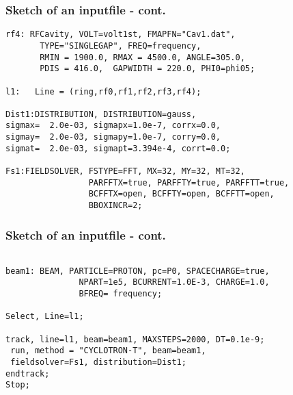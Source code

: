 \documentclass[xcolor=pdftex,table,10pt,yellow,mathserif]{beamer}
\begin{document}
\begin{frame}[fragile]
\frametitle{Sketch of an inputfile - cont.} 
\begin{verbatim}
rf4: RFCavity, VOLT=volt1st, FMAPFN="Cav1.dat", 
       TYPE="SINGLEGAP", FREQ=frequency, 
       RMIN = 1900.0, RMAX = 4500.0, ANGLE=305.0, 
       PDIS = 416.0,  GAPWIDTH = 220.0, PHI0=phi05; 

l1:   Line = (ring,rf0,rf1,rf2,rf3,rf4);

Dist1:DISTRIBUTION, DISTRIBUTION=gauss,
sigmax=  2.0e-03, sigmapx=1.0e-7, corrx=0.0,
sigmay=  2.0e-03, sigmapy=1.0e-7, corry=0.0,
sigmat=  2.0e-03, sigmapt=3.394e-4, corrt=0.0;

Fs1:FIELDSOLVER, FSTYPE=FFT, MX=32, MY=32, MT=32, 
                 PARFFTX=true, PARFFTY=true, PARFFTT=true,
                 BCFFTX=open, BCFFTY=open, BCFFTT=open, 
                 BBOXINCR=2;
\end{verbatim}
\end{frame}

\begin{frame}[fragile]
\frametitle{Sketch of an inputfile - cont.} 
\begin{verbatim}

beam1: BEAM, PARTICLE=PROTON, pc=P0, SPACECHARGE=true, 
               NPART=1e5, BCURRENT=1.0E-3, CHARGE=1.0, 
               BFREQ= frequency;

Select, Line=l1;

track, line=l1, beam=beam1, MAXSTEPS=2000, DT=0.1e-9;
 run, method = "CYCLOTRON-T", beam=beam1, 
 fieldsolver=Fs1, distribution=Dist1;
endtrack;
Stop;
\end{verbatim}
\end{frame}
\end{document}
